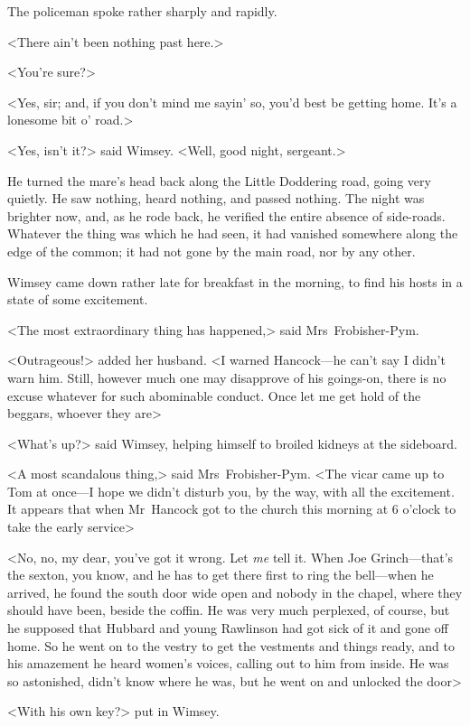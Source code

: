 The policeman spoke rather sharply and rapidly.

<There ain't been nothing past here.>

<You're sure?>

<Yes, sir; and, if you don't mind me sayin' so, you'd best be getting home. It's a lonesome bit o' road.>

<Yes, isn't it?> said Wimsey. <Well, good night, sergeant.>

He turned the mare's head back along the Little Doddering road, going very quietly. He saw nothing, heard nothing, and passed nothing. The night was brighter now, and, as he rode back, he verified the entire absence of side-roads. Whatever the thing was which he had seen, it had vanished somewhere along the edge of the common; it had not gone by the main road, nor by any other.

\divider
Wimsey came down rather late for breakfast in the morning, to find his hosts in a state of some excitement.

<The most extraordinary thing has happened,> said Mrs~Frobisher-Pym.

<Outrageous!> added her husband. <I warned Hancock—he can't say I didn't warn him. Still, however much one may disapprove of his goings-on, there is no excuse whatever for such abominable conduct. Once let me get hold of the beggars, whoever they are\longdash>

<What's up?> said Wimsey, helping himself to broiled kidneys at the sideboard.

<A most scandalous thing,> said Mrs~Frobisher-Pym. <The vicar came up to Tom at once—I hope we didn't disturb you, by the way, with all the excitement. It appears that when Mr~Hancock got to the church this morning at 6 o'clock to take the early service\longdash>

<No, no, my dear, you've got it wrong. Let \emph{me} tell it. When Joe Grinch—that's the sexton, you know, and he has to get there first to ring the bell—when he arrived, he found the south door wide open and nobody in the chapel, where they should have been, beside the coffin. He was very much perplexed, of course, but he supposed that Hubbard and young Rawlinson had got sick of it and gone off home. So he went on to the vestry to get the vestments and things ready, and to his amazement he heard women's voices, calling out to him from inside. He was so astonished, didn't know where he was, but he went on and unlocked the door\longdash>

<With his own key?> put in Wimsey.

